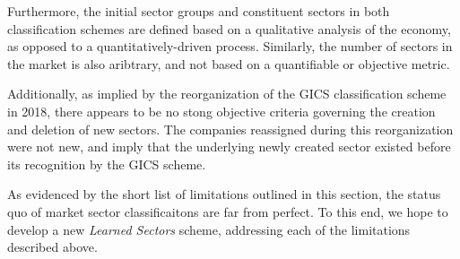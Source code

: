 \documentclass[../main.tex]{subfiles}
\begin{document}
Furthermore, the initial sector groups and constituent sectors in both classification schemes are defined based on a qualitative analysis of the economy, as opposed to a quantitatively-driven process. Similarly, the number of sectors in the market is also aribtrary, and not based on a quantifiable or objective metric.

Additionally, as implied by the reorganization of the GICS classification scheme in 2018, there appears to be no stong objective criteria governing the creation and deletion of new sectors. The companies reassigned during this reorganization were not new, and imply that the underlying newly created sector existed before its recognition by the GICS scheme.

As evidenced by the short list of limitations outlined in this section, the status quo of market sector classificaitons are far from perfect. To this end, we hope to develop a new \textit{Learned Sectors} scheme, addressing each of the limitations described above.
\end{document}
